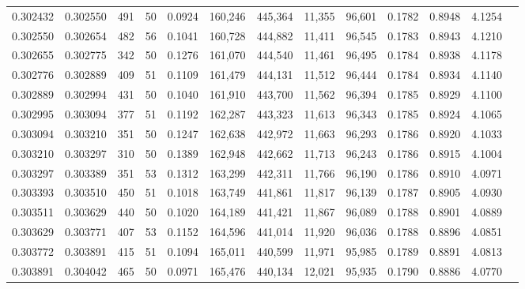 \begin{tabular}{rrrrrrrrrrrrr}
0.302432 & 0.302550 &   491 &  50 &                                     0.0924 & 160,246 & 445,364 &  11,355 &  96,601 & 0.1782 & 0.8948 & 4.1254 \\
0.302550 & 0.302654 &   482 &  56 &                                     0.1041 & 160,728 & 444,882 &  11,411 &  96,545 & 0.1783 & 0.8943 & 4.1210 \\
0.302655 & 0.302775 &   342 &  50 &                                     0.1276 & 161,070 & 444,540 &  11,461 &  96,495 & 0.1784 & 0.8938 & 4.1178 \\
0.302776 & 0.302889 &   409 &  51 &                                     0.1109 & 161,479 & 444,131 &  11,512 &  96,444 & 0.1784 & 0.8934 & 4.1140 \\
0.302889 & 0.302994 &   431 &  50 &                                     0.1040 & 161,910 & 443,700 &  11,562 &  96,394 & 0.1785 & 0.8929 & 4.1100 \\
0.302995 & 0.303094 &   377 &  51 &                                     0.1192 & 162,287 & 443,323 &  11,613 &  96,343 & 0.1785 & 0.8924 & 4.1065 \\
0.303094 & 0.303210 &   351 &  50 &                                     0.1247 & 162,638 & 442,972 &  11,663 &  96,293 & 0.1786 & 0.8920 & 4.1033 \\
0.303210 & 0.303297 &   310 &  50 &                                     0.1389 & 162,948 & 442,662 &  11,713 &  96,243 & 0.1786 & 0.8915 & 4.1004 \\
0.303297 & 0.303389 &   351 &  53 &                                     0.1312 & 163,299 & 442,311 &  11,766 &  96,190 & 0.1786 & 0.8910 & 4.0971 \\
0.303393 & 0.303510 &   450 &  51 &                                     0.1018 & 163,749 & 441,861 &  11,817 &  96,139 & 0.1787 & 0.8905 & 4.0930 \\
0.303511 & 0.303629 &   440 &  50 &                                     0.1020 & 164,189 & 441,421 &  11,867 &  96,089 & 0.1788 & 0.8901 & 4.0889 \\
0.303629 & 0.303771 &   407 &  53 &                                     0.1152 & 164,596 & 441,014 &  11,920 &  96,036 & 0.1788 & 0.8896 & 4.0851 \\
0.303772 & 0.303891 &   415 &  51 &                                     0.1094 & 165,011 & 440,599 &  11,971 &  95,985 & 0.1789 & 0.8891 & 4.0813 \\
0.303891 & 0.304042 &   465 &  50 &                                     0.0971 & 165,476 & 440,134 &  12,021 &  95,935 & 0.1790 & 0.8886 & 4.0770 \\

\end{tabular}
